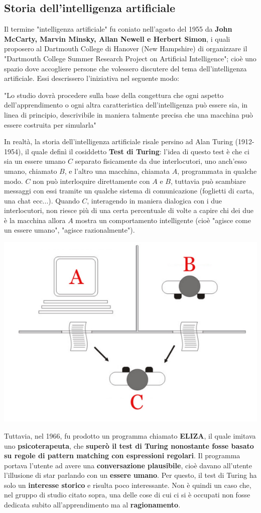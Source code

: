 \documentclass[12pt]{article}
\begin{document}
\subsection{Storia dell'intelligenza artificiale}
Il termine "intelligenza artificiale" fu coniato nell'agosto del 1955 da \textbf{John McCarty, Marvin Minsky, Allan Newell e Herbert Simon}, i quali proposero al Dartmouth College di Hanover (New Hampshire) di organizzare il "Dartmouth College Summer Research Project on Artificial Intelligence"; cioè uno spazio
dove accogliere persone che volessero discutere del tema dell'intelligenza artificiale. Essi descrissero l'iniziativa nel seguente modo:
\begin{center}
    "Lo studio dovrà procedere sulla base della congettura che ogni aspetto dell'apprendimento o ogni altra caratteristica dell'intelligenza può essere sia, in linea di principio, descrivibile in maniera talmente precisa che una macchina può essere costruita per simularla"
\end{center} 
In realtà, la storia dell'intelligenza artificiale risale persino ad Alan Turing (1912-1954), il quale definì il cosiddetto \textbf{Test di Turing}: l'idea di questo test è che ci sia un essere umano $C$ separato fisicamente da due interlocutori, uno anch'esso umano, chiamato $B$, e l'altro una macchina, chiamata $A$, programmata in qualche modo.
$C$ non può interloquire direttamente con $A$ e $B$, tuttavia può scambiare messaggi con essi tramite un qualche sistema di comunicazione (foglietti di carta, una chat ecc...). Quando $C$, interagendo in maniera dialogica con i due interlocutori, non riesce più di una certa percentuale di volte a capire chi dei due è la macchina allora $A$ mostra un
comportamento intelligente (cioè "agisce come un essere umano", "agisce razionalmente").
\begin{center}
    \includegraphics[width = 0.50\linewidth]{Images/2.PNG}
\end{center}
Tuttavia, nel 1966, fu prodotto un programma chiamato \textbf{ELIZA}, il quale imitava uno \textbf{psicoterapeuta}, che \textbf{superò il test di Turing nonostante fosse basato su regole di pattern matching con espressioni regolari}. Il programma portava l'utente ad avere una
\textbf{conversazione plausibile}, cioè davano all'utente l'illusione di star parlando con un \textbf{essere umano}. Per questo, il test di Turing ha solo un \textbf{interesse storico} e risulta poco interessante.
Non è quindi un caso che, nel gruppo di studio citato sopra, una delle cose di cui ci si è occupati non fosse dedicata subito all'apprendimento ma al \textbf{ragionamento}.
\end{document}

